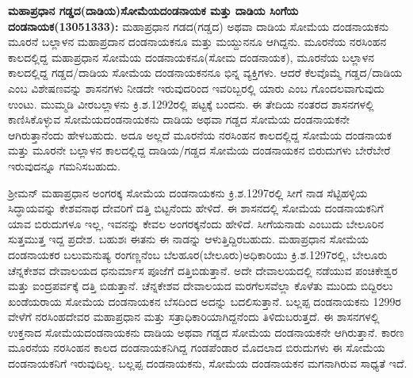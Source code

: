 \newpage

\textbf{ಮಹಾಪ್ರಧಾನ ಗಡ್ಡದ(ದಾಡಿಯ)ಸೋಮೆಯದಂಡನಾಯಕ ಮತ್ತು ದಾಡಿಯ ಸಿಂಗೆಯ ದಂಡನಾಯಕ(1305\general{\enginline{-}}1333):} ಮಹಾಪ್ರಧಾನ ಗಡದ(ಗಡ್ಡದ) ಅಥವಾ ದಾಡಿಯ ಸೋಮೆಯ ದಂಡನಾಯಕನು ಮೂರನೆ ಬಲ್ಲಾಳನ ಮಹಾಪ್ರದಾನ ದಂಡನಾಯಕನೂ ಮತ್ತು ಮಯ್ದುನನೂ ಆಗಿದ್ದನು. ಮೂರನೆಯ ನರಸಿಂಹನ ಕಾಲದಲ್ಲಿದ್ದ ಮಹಾಪ್ರಧಾನ ಸೋಮೆಯ ದಂಡನಾಯಕನೂ(ಸೋಮ ದಂಡನಾಯಕ), ಮೂರನೆಯ ಬಲ್ಲಾಳನ ಕಾಲದಲ್ಲಿದ್ದ ಗಡ್ಡದ/ದಾಡಿಯ ಸೋಮೆಯ ದಂಡ\-ನಾಯಕನನೂ ಭಿನ್ನ ವ್ಯಕ್ತಿಗಳು. ಆದರೆ ಕೆಲವೊಮ್ಮೆ ಗಡ್ಡದ/ದಾಡಿಯ ಎಂಬ ವಿಶೇಷಣವನ್ನು ಶಾಸನಗಳು ನೀಡದೇ ಇರುವುದರಿಂದ ಇವರಿಬ್ಬರಲ್ಲಿ ಯಾರು ಎಂಬ ಗೊಂದಲವಾಗುವುದು ಉಂಟು. ಮುಮ್ಮಡಿ ವೀರಬಲ್ಲಾಳನು ಕ್ರಿ.ಶ.1292ರಲ್ಲಿ ಪಟ್ಟಕ್ಕೆ ಬಂದನು. ಈ ತೇದಿಯ ನಂತರದ ಶಾಸನಗಳಲ್ಲಿ ಕಾಣಿಸಿಕೊಳ್ಳುವ ಸೋಮೆಯದಂಡನಾಯಕನು ದಾಡಿಯ ಅಥವಾ ಗಡ್ಡದ ಸೋಮೆಯ ದಂಡನಾಯಕನೇ ಆಗಿರುತ್ತಾನೆಂದು ಹೇಳಬಹುದು. ಅದೂ ಅಲ್ಲದೆ ಮೂರನೆಯ ನರಸಿಂಹನ ಕಾಲದಲ್ಲಿದ್ದ ಸೋಮೆಯ ದಂಡನಾಯಕ ಮತ್ತು ಮೂರನೇ ಬಲ್ಲಾಳನ ಕಾಲದಲ್ಲಿದ್ದ ದಾಡಿಯ/ಗಡ್ಡದ ಸೋಮೆಯ ದಂಡನಾಯಕನ ಬಿರುದುಗಳು ಬೇರೆಬೇರೆ ಇರುವುದನ್ನೂ ಗಮನಿಸಬಹುದು.

ಶ‍್ರೀಮನ್​ ಮಹಾಪ್ರಧಾನ ಅಂಗರಕ್ಕ ಸೋಮೆಯ ದಂಡನಾಯಕನು ಕ್ರಿ.ಶ.1297ರಲ್ಲಿ ಸೀಗೆ ನಾಡ ಸೆಟ್ಟಿಹಳ್ಳಿಯ ಸಿದ್ಧಾಯವನ್ನು ಕೇಶವನಾಥ ದೇವರಿಗೆ ದತ್ತಿ ಬಿಟ್ಟನೆಂದು ಹೇಳಿದೆ. ಈ ಶಾಸನದಲ್ಲಿ ಸೋಮೆಯ ದಂಡನಾಯಕನಿಗೆ ಯಾವ ಬಿರುದುಗಳೂ ಇಲ್ಲ, ಇವನನ್ನು ಕೇವಲ ಅಂಗರಕ್ಕನೆಂದು ಹೇಳಿದೆ. ಸೀಗೆಯನಾಡು ಎಂಬುದು ಬೇಲೂರಿನ ಸುತ್ತಮುತ್ತ ಇದ್ದ ಪ್ರದೇಶ. ಬಹುಶಃ ಈತನು ಈ ನಾಡನ್ನು ಆಳುತ್ತಿದ್ದಿರಬಹುದು. ಮಹಾಪ್ರಧಾನ ಸೋಮೆಯ ದಂಡನಾಯಕರ ಬಲುಮನುಷ್ಯ ರಂಗಣ್ಣನೆಂಬ ಬೆಲಹೂರ(ಬೇಲೂರು)ಅಧಿಕಾರಿಯು ಕ್ರಿ.ಶ.1297ರಲ್ಲಿ, ಬೇಲೂರು ಚೆನ್ನಕೇಶವ ದೇವಾಲಯದ ಧನುರ್ಮಾಸ ಪೂಜೆಗೆ ದತ್ತಿಬಿಡುತ್ತಾನೆ. ಅದೇ ದೇವಾಲಯದಲ್ಲಿ ನಡೆಯುವ ಪಂಚಿಕೇಶ್ವರ ಮತ್ತು ಐಂದ್ರಪರ್ವಕ್ಕೆ ದತ್ತಿ ಬಿಡುತ್ತಾನೆ. ಚೆನ್ನಕೇಶವ ದೇವಾಲಯದ ಮರಗೆಲಸವೆಲ್ಲಾ ಕೊಳೆತು ಮುರಿದು ಬಿದ್ದಿರಲು ಖಂಡೆಯರಾಯ ಸೋಮೆಯ ದಂಡನಾಯಕನ ಬೆಸದಿಂದ ಅದನ್ನು ಬದಲಿಸುತ್ತಾನೆ. ಬಲ್ಲಪ್ಪ ದಂಡನಾಯಕನು 1299ರ ವೇಳೆಗೆ ನರಸಿಂಹದೇವರ ಮಹಾಪ್ರಧಾನ ಮತ್ತು ಸತ್ರಾಧಿಕಾರಿಯಾಗಿದ್ದನೆಂದು ತಿಳಿದುಬರುತ್ತದೆ. ಈ ಶಾಸನಗಳಲ್ಲಿ ಉಕ್ತನಾದ ಸೋಮೆಯದಂಡನಾಯಕನು ದಾಡಿಯ ಅಥವಾ ಗಡ್ಡದ ಸೋಮೆಯ ದಂಡನಾಯಕನೇ ಆಗಿರುತ್ತಾನೆ. ಕಾರಣ ಮೂರನೆಯ ನರಸಿಂಹನ ಕಾಲದ ದಂಡನಾಯಕನಿಗಿದ್ದ ಗಂಡಪೆಂಡಾರ ಮೊದಲಾದ ಬಿರುದುಗಳು ಈ ಸೋಮೆಯ ದಂಡನಾಯಕನಿಗೆ ಇರುವುದಿಲ್ಲ. ಬಲ್ಲಪ್ಪ ದಂಡನಾಯಕನು, ಸೋಮೆಯ ದಂಡನಾಯಕನ ಮಗನಾಗಿರುವ ಸಾಧ್ಯತೆ ಇದೆ.

